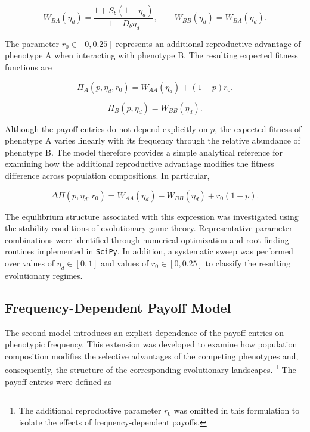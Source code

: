 \begin{equation}
W_{BA}(\eta_d)=\frac{1+S_b(1-\eta_d)}{1+D_b\eta_d},
\qquad
W_{BB}(\eta_d)=W_{BA}(\eta_d).
\label{eq:constant_payoff_B}
\end{equation}

The parameter $r_0\in[0,0.25]$ represents an additional reproductive advantage of phenotype A when interacting with phenotype B. The resulting expected fitness functions are

\begin{equation}
\Pi_A(p,\eta_d,r_0)=W_{AA}(\eta_d)+(1-p)r_0.
\label{eq:constant_fitness_A}
\end{equation}

\begin{equation}
\Pi_B(p,\eta_d)=W_{BB}(\eta_d).
\label{eq:constant_fitness_B}
\end{equation}


Although the payoff entries do not depend explicitly on \(p\), the expected fitness of phenotype A varies linearly with its frequency through the relative abundance of phenotype B. The model therefore provides a simple analytical reference for examining how the additional reproductive advantage modifies the fitness difference across population compositions. In particular,

\begin{equation}
\Delta\Pi(p,\eta_d,r_0)
=
W_{AA}(\eta_d)-W_{BB}(\eta_d)
+r_0(1-p).
\label{eq:constant_fitness_difference}
\end{equation}

The equilibrium structure associated with this expression was investigated using the stability conditions of evolutionary game theory. Representative parameter combinations were identified through numerical optimization and root-finding routines implemented in \texttt{SciPy}. In addition, a systematic sweep was performed over values of \(\eta_d\in[0,1]\) and values of \(r_0\in[0,0.25]\) to classify the resulting evolutionary regimes. \\ 


\subsection{Frequency-Dependent Payoff Model}
\label{sec:frequency_dependent_methodology}

The second model introduces an explicit dependence of the payoff entries on phenotypic frequency. This extension was developed to examine how population composition modifies the selective advantages of the competing phenotypes and, consequently, the structure of the corresponding evolutionary landscapes. \footnote{The additional reproductive parameter \(r_0\) was omitted in this formulation to isolate the effects of frequency-dependent payoffs.} The payoff entries were defined as


